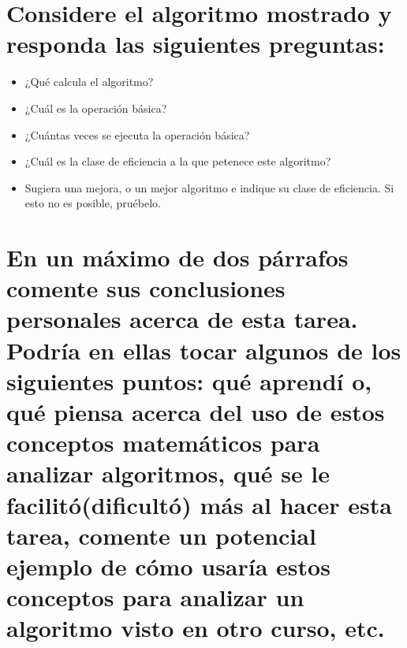 \documentclass{article}
\begin{document}
\section{Considere el algoritmo mostrado y responda las siguientes preguntas:}

\begin{itemize}
\item ¿Qué calcula el algoritmo?
\item ¿Cuál es la operación básica?
\item ¿Cuántas veces se ejecuta la operación básica?
\item ¿Cuál es la clase de eficiencia a la que petenece este algoritmo?
\item Sugiera una mejora, o un mejor algoritmo e indique su clase de eficiencia. Si esto no es posible, pruébelo.
\end{itemize}

\section{En un máximo de dos párrafos comente sus conclusiones personales acerca de esta tarea. Podría en ellas tocar algunos de los siguientes puntos: qué aprendí o, qué piensa acerca del uso de estos conceptos matemáticos para analizar algoritmos, qué se le facilitó(dificultó) más al hacer esta tarea, comente un potencial ejemplo de cómo usaría estos conceptos para analizar un algoritmo visto en otro curso, etc.}
\end{document}

